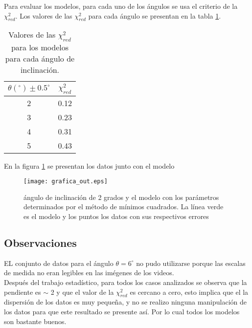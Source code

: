 \documentclass[12pt,letterpaper]{article}
\begin{document}
Para evaluar los modelos, para cada uno de los ángulos se usa el criterio de la $ \chi_{red}^{2}$. Los valores de las  $ \chi_{red}^{2}$ para cada ángulo se presentan en la tabla \ref{xi}.

\begin{table}[!h]
\begin{center}
\begin{tabular}{cc}
\hline 
$\theta (^{\circ}) \pm 0.5 ^{\circ}$ &  $\chi_{red}^{2}$\\ 
\hline
\hline 
2 & 0.12\\ 
 
3 &  0.23\\ 

4 & 0.31\\ 

5 & 0.43\\
\hline 
\end{tabular}
\caption{Valores de las $\chi_{red}^{2}$ para los modelos para cada ángulo de inclinación. }\label{xi}
\end{center}
\end{table}

En la figura \ref{fm} se presentan los datos junto con el modelo

\begin{figure}[!h]

\begin{center}
\texttt{[image: grafica\_out.eps]} 
\caption{ángulo de inclinación de 2 grados y el modelo con los parámetros determinados por el método de mínimos cuadrados. La línea verde es el modelo y los puntos los datos con sus respectivos errores}\label{fm}
\end{center}
\end{figure}



\subsection{Observaciones}

EL conjunto de datos para el ángulo $\theta = 6 ^{\circ}$ no pudo utilizarse porque las escalas de medida no eran legibles en las imégenes de los videos. \\

Después del trabajo estadístico,  para todos los casos analizados se observa que la pendiente es $ \sim $ 2 y que el valor de la $\chi_{red}^{2}$ es cercano a cero, esto implica que el la dispersión de los datos es muy pequeña, y no se realizo ninguna manipulación de los datos para que este resultado se presente así. Por lo cual todos los modelos son bastante buenos.
\end{document}
